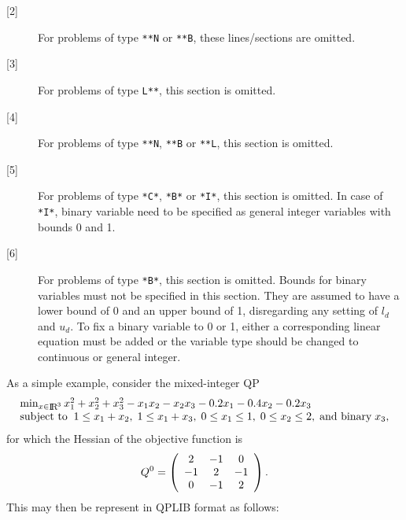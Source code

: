 \begin{description}
\item [{[2]}]
For problems of type \texttt{**N} or \texttt{**B}, these lines/sections
are omitted.
\item [{[3]}]
For problems of type \texttt{L**}, this section is omitted.
\item [{[4]}]
For problems of type \texttt{**N}, \texttt{**B} or \texttt{**L},
this section is omitted.
\item [{[5]}]
For problems of type \texttt{*C*}, \texttt{*B*} or \texttt{*I*},
this section is omitted. In case of \texttt{*I*}, binary variable need to be specified as general integer variables with bounds 0 and 1.
\item [{[6]}]
For problems of type \texttt{*B*}, this section is omitted.
Bounds for binary variables must not be specified in this section. They are assumed to have a lower bound of 0 and an upper bound of 1, disregarding any setting of $l_d$ and $u_d$. To fix a binary variable to 0 or 1, either a corresponding linear equation must be added or the variable type should be changed to continuous or general integer.
\end{description}

As a simple example, consider the mixed-integer QP
\[\arr{l}{\min_{x \in \smallRe^3} x_1^2 + x_2^2 + x_3^2 - x_1 x_2 - x_2 x_3
  - 0.2 x_1  -0.4 x_2 - 0.2 x_3 \\
\st 1 \leq x_1 + x_2, \; 1 \leq x_1 + x_3, \; 0 \leq x_1 \leq 1,
\; 0 \leq x_2 \leq 2, \; \mbox{and binary} \; x_3,}
\]
for which the Hessian of the objective function is
\[Q^0 = \mat{ccc}{2 & -1 & 0 \\ -1 & 2 & -1 \\ 0 & -1 & 2}.\]
This may then be represent in QPLIB format as follows:

